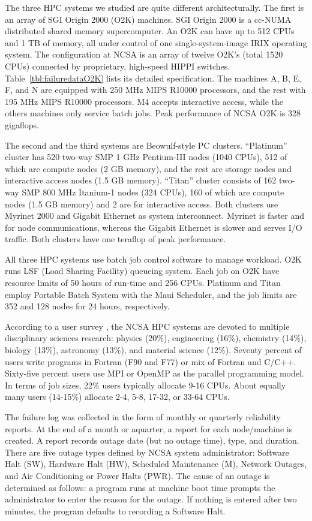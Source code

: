 \documentclass[10pt,twocolumn]{article}
\begin{document}
\label{s:sys}
The three HPC systems we studied are quite different 
architecturally. The first is an array of SGI Origin 
2000 (O2K) machines. 
SGI Origin 2000 is a cc-NUMA distributed 
shared memory supercomputer. An O2K can have up to 512
CPUs and 1 TB of memory, all under control of 
one single-system-image IRIX operating system. 
The configuration at NCSA is an array of twelve O2K's
(total 1520 CPUs) connected by proprietary, high-speed HIPPI 
switches. Table~\ref{tbl:failuredataO2K} lists its detailed 
specification. The machines A, B, E, F, and N are equipped 
with 250 MHz MIPS R10000 processors, and the rest with 
195 MHz MIPS R10000 processors. M4 accepts interactive 
access, while the others machines only service 
batch jobs. Peak performance of NCSA O2K is 
328 gigaflops. 

The second and the third systems are Beowulf-style PC clusters.
``Platinum'' cluster has 520 two-way SMP 1 GHz Pentium-III nodes 
(1040 CPUs), 512 of which are compute nodes (2 GB memory), 
and the rest are storage nodes and interactive access nodes 
(1.5 GB memory). ``Titan'' cluster consists of 162 two-way 
SMP 800 MHz Itanium-1 nodes (324 CPUs), 160 of 
which are compute nodes (1.5 GB memory) and 2 are for 
interactive access. Both clusters use
Myrinet 2000 and Gigabit Ethernet as system interconnect. 
Myrinet is faster and for node communications, whereas 
the Gigabit Ethernet is slower and serves I/O traffic.
Both clusters have one teraflop of peak performance. 

All three HPC systems use batch job control software to manage
workload. O2K runs LSF (Load Sharing Facility) queueing system.
Each job on O2K have resource limits of 50 hours of run-time
and 256 CPUs. Platinum and Titan employ Portable Batch 
System with the Maui Scheduler, and the job limits are 352
and 128 nodes for 24 hours, respectively.

According to a user survey \cite{NCSASurvey}, the NCSA HPC 
systems are devoted to multiple disciplinary sciences research: 
physics (20\%), engineering (16\%), chemistry (14\%), 
biology (13\%), astronomy (13\%), and material science (12\%). 
Seventy percent of users write programs in Fortran (F90 and F77) or mix of 
Fortran and C/C++. Sixty-five percent users use MPI or 
OpenMP as the parallel programming model. In terms of job 
sizes, 22\% users typically allocate 9-16 CPUs. About equally 
many users (14-15\%) allocate 2-4, 5-8, 17-32, or 33-64 CPUs.

The failure log was collected in the form of monthly or
quarterly reliability reports. At the end of a month or aquarter, 
a report for each node/machine is created. A report records outage
date (but no outage time), type, and duration. There are 
five outage types defined by NCSA system administrator: 
Software Halt (SW), Hardware Halt (HW), Scheduled Maintenance (M), 
Network Outages, and Air Conditioning or Power Halts (PWR). 
The cause of an outage is determined as follows: a program runs 
at machine boot time prompts the administrator to enter the 
reason for the outage. If nothing is entered after two 
minutes, the program defaults to recording a Software Halt.
\end{document}
